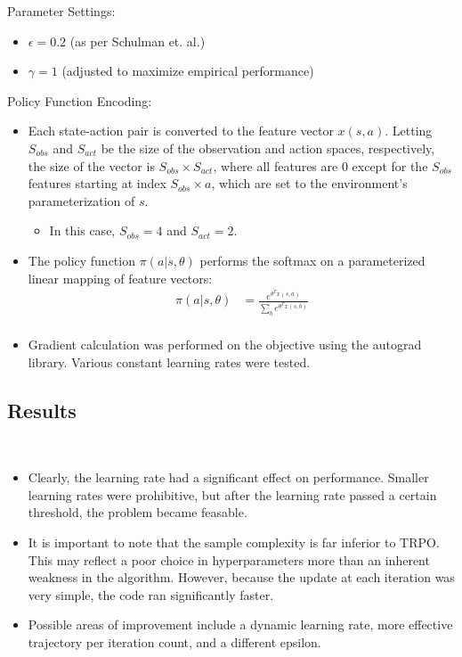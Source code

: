 \documentclass[a4paper]{article}
\begin{document}
Parameter Settings:
\begin{itemize}
    \item $\epsilon = 0.2$ (as per Schulman et. al.)
    \item $\gamma = 1$ (adjusted to maximize empirical performance)
\end{itemize}
Policy Function Encoding:
\begin{itemize}
    \item Each state-action pair is converted to the feature vector $x(s, a)$.
        Letting $S_{obs}$ and $S_{act}$ be the size of the observation and
        action spaces, respectively, the size of the vector is $S_{obs} \times
        S_{act}$, where all features are $0$ except for the $S_{obs}$ features
        starting at index $S_{obs} \times a$, which are set to the
        environment's parameterization of $s$.
    \begin{itemize}
        \item In this case, $S_{obs} = 4$ and $S_{act} = 2$.
    \end{itemize}
    \item The policy function $\pi(a | s, \theta)$ performs the softmax on a
        parameterized linear mapping of feature vectors:
        \begin{align*}
            \pi(a | s, \theta) &= \frac{e^{\theta^T x(s, a)}}
            {\sum_{b} e^{\theta^T x(s, b)}}\\
        \end{align*}
    \item Gradient calculation was performed on the objective using the 
        autograd library. Various constant learning rates were tested.
\end{itemize}
\subsection*{Results}
\begin{centering}
    \scalebox{0.6}{} \\
\end{centering}
\begin{itemize}
    \item Clearly, the learning rate had a significant effect on performance.
        Smaller learning rates were prohibitive, but after the learning rate
        passed a certain threshold, the problem became feasable.
    \item It is important to note that the sample complexity is far inferior to
        TRPO. This may reflect a poor choice in hyperparameters more than an
        inherent weakness in the algorithm. However, because the update at each
        iteration was very simple, the code ran significantly faster.
    \item Possible areas of improvement include a dynamic learning rate, more
        effective trajectory per iteration count, and a different epsilon.
\end{itemize}
\end{document}
